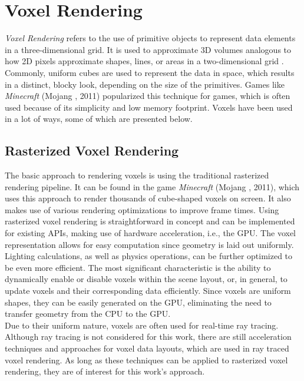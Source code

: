 \section{Voxel Rendering} \label{sec-voxel-rendering}

\noindent
\emph{Voxel Rendering} refers to the use of primitive objects to represent data elements in a three-dimensional 
grid. It is used to approximate 3D volumes analogous to how 2D pixels approximate shapes, lines, or areas in a 
two-dimensional grid \cite{MegaVoxels2023}. Commonly, uniform cubes are used to represent the data in space, 
which results in a distinct, blocky look, depending on the size of the primitives. Games like \emph{Minecraft} 
(Mojang \cite{Mojang2024}, 2011) popularized this technique for games, which is often used because of its 
simplicity and low memory footprint. Voxels have been used in a lot of ways, some of which are presented below.


\subsection*{Rasterized Voxel Rendering} \label{subsec-rasterized-voxel-rendering}

The basic approach to rendering voxels is using the traditional rasterized rendering pipeline.
It can be found in the game \emph{Minecraft} (Mojang \cite{Mojang2024}, 2011), which uses 
this approach to render thousands of cube-shaped voxels on screen. It also makes use of various 
rendering optimizations to improve frame times. Using rasterized voxel rendering is straightforward 
in concept and can be implemented for existing \ac{API}s, making use of hardware acceleration, i.e., 
the \ac{GPU}. The voxel representation allows for easy computation since geometry is laid out 
uniformly. Lighting calculations, as well as physics operations, can be further optimized to be 
even more efficient. The most significant characteristic is the ability to dynamically enable or 
disable voxels within the scene layout, or, in general, to update voxels and their corresponding 
data efficiently. Since voxels are uniform shapes, they can be easily generated on the \ac{GPU}, 
eliminating the need to transfer geometry from the \ac{CPU} to the \ac{GPU}. \\

\noindent
Due to their uniform nature, voxels are often used for real-time ray tracing. Although ray tracing 
is not considered for this work, there are still acceleration techniques and approaches for voxel 
data layouts, which are used in ray traced voxel rendering. As long as these techniques can be 
applied to rasterized voxel rendering, they are of interest for this work's approach.


